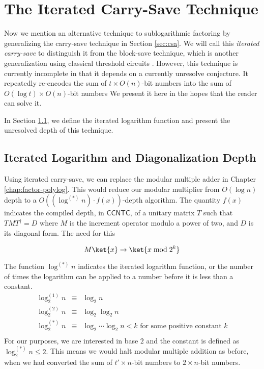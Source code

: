 \section{The Iterated Carry-Save Technique}
\label{sec:blocksave}

Now we mention an alternative technique to sublogarithmic
factoring by generalizing
the carry-save technique in Section \ref{sec:csa}. We will call this
\emph{iterated carry-save} to distinguish it from the block-save
technique, which is another generalization using classical threshold
circuits \cite{Siu1993}. However, this technique is currently incomplete
in that it depends on a currently unresolve conjecture. It repeatedly
re-encodes the sum of $t\times O(n)$-bit numbers into the
sum of $O(\log t) \times O(n)$-bit numbers We present it
here in the hopes that the reader can solve it.

In Section \ref{subsec:fsl-itlog}, we define the iterated logarithm
function and present the unresolved depth of this technique.

\subsection{Iterated Logarithm and Diagonalization Depth}
\label{subsec:fsl-itlog}

Using iterated carry-save, we can replace the modular multiple adder in
Chapter \ref{chap:factor-polylog}. This
would reduce our modular multiplier from $O(\log n)$ depth to 
a $O((\log^{(*)}n)\cdot f(x))$-depth algorithm. The quantity $f(x)$ indicates
the compiled depth, in $\textsf{CCNTC}$, of a unitary matrix $T$ such that $TMT^{\dag} = D$
where $M$ is the increment operator modulo a power of two, and $D$ is its diagonal form.
The need for this 

\begin{equation}
M\ket{x} \rightarrow \ket{x \bmod 2^k}
\end{equation}

The function $\log^{(*)}n$ indicates
the iterated logarithm function, or the number of times the
logarithm can be applied to a number before it is less than a
constant.
\begin{eqnarray}
\log^{(1)}_2 n & \equiv & \log_2 n \\
\log^{(2)}_2 n & \equiv & \log_2\log_2 n \\
\log^{(*)}_2 n & \equiv & \log_2 \cdots \log_2 n < k \text{ for some positive constant } k\\
\end{eqnarray}
For our purposes, we are interested in base $2$ and
the constant is defined as $\log^{(*)}_2 n \le 2$. This
means we would halt modular multiple addition as before, when we
had converted the sum of $t'\times n$-bit numbers to $2 \times n$-bit numbers.

